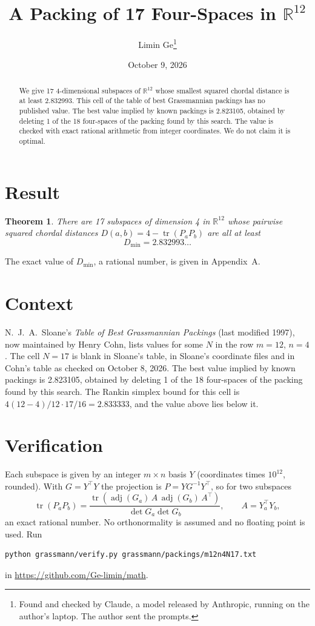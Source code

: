 \documentclass[11pt,a4paper]{article}
\title{A Packing of 17 Four-Spaces in $\mathbb{R}^{12}$}
\author{Limin Ge\thanks{Found and checked by Claude, a model released by Anthropic, running on the author's laptop. The author sent the prompts.}}
\date{October 9, 2026}
\newtheorem*{theorem}{Theorem}
\begin{document}
\maketitle
\begin{abstract}
We give 17 4-dimensional subspaces of $\mathbb{R}^{12}$ whose smallest squared chordal distance is at least 2.832993. This cell of the table of best Grassmannian packings has no published value. The best value implied by known packings is 2.823105, obtained by deleting 1 of the 18 four-spaces of the packing found by this search. The value is checked with exact rational arithmetic from integer coordinates. We do not claim it is optimal.
\end{abstract}

\section{Result}
\begin{theorem}
There are 17 subspaces of dimension 4 in $\mathbb{R}^{12}$ whose pairwise squared chordal distances $D(a,b) = 4 - \operatorname{tr}(P_aP_b)$ are all at least
\[ D_{\min} = 2.832993\ldots \]
\end{theorem}
The exact value of $D_{\min}$, a rational number, is given in Appendix~A.


\section{Context}
N.~J.~A.~Sloane's \emph{Table of Best Grassmannian Packings} (last modified 1997), now maintained by Henry Cohn, lists values for some $N$ in the row $m=12$, $n=4$. The cell $N=17$ is blank in Sloane's table, in Sloane's coordinate files and in Cohn's table as checked on October 8, 2026. The best value implied by known packings is 2.823105, obtained by deleting 1 of the 18 four-spaces of the packing found by this search. The Rankin simplex bound for this cell is $4(12-4)/12\cdot 17/16 = 2.833333$, and the value above lies below it.


\section{Verification}
Each subspace is given by an integer $m\times n$ basis $Y$ (coordinates times $10^{12}$, rounded). With $G=Y^\top Y$ the projection is $P=YG^{-1}Y^\top$, so for two subspaces
\[ \operatorname{tr}(P_aP_b)=\frac{\operatorname{tr}(\operatorname{adj}(G_a)\,A\,\operatorname{adj}(G_b)\,A^\top)}{\det G_a\det G_b},\qquad A=Y_a^\top Y_b, \]
an exact rational number. No orthonormality is assumed and no floating point is used. Run
\begin{verbatim}
python grassmann/verify.py grassmann/packings/m12n4N17.txt
\end{verbatim}
in \url{https://github.com/Ge-limin/math}.
\end{document}
